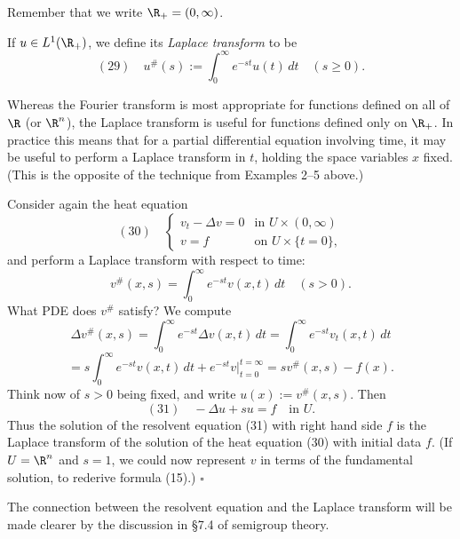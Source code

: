 Remember that we write $\R_+=(0,\infty)$.

\begin{definition}
\label{def:laplace-transform}
If $u\in L^1(\R_+)$, we define its \textit{Laplace transform} to be
$$(29) \quad u^{\#}(s) := \int_0^\infty e^{-st}u(t)\,dt \quad (s\ge 0).$$
\end{definition}

Whereas the Fourier transform is most appropriate for functions defined on all of $\R$ (or $\R^n$), the Laplace transform is useful for functions defined only on $\R_+$. In practice this means that for a partial differential equation involving time, it may be useful to perform a Laplace transform in $t$, holding the space variables $x$ fixed. (This is the opposite of the technique from Examples 2--5 above.)

\begin{example}
\label{ex:resolvent-laplace-transform}
Consider again the heat equation
$$(30) \quad \begin{cases} v_t-\Delta v=0 & \text{in } U\times(0,\infty) \\ v=f & \text{on } U\times\{t=0\}, \end{cases}$$
and perform a Laplace transform with respect to time:
$$v^{\#}(x,s) = \int_0^\infty e^{-st}v(x,t)\,dt \quad (s>0).$$
What PDE does $v^{\#}$ satisfy? We compute
$$\Delta v^{\#}(x,s) = \int_0^\infty e^{-st}\Delta v(x,t)\,dt = \int_0^\infty e^{-st}v_t(x,t)\,dt$$
$$= s\int_0^\infty e^{-st}v(x,t)\,dt + e^{-st}v\Big|_{t=0}^{t=\infty} = sv^{\#}(x,s) - f(x).$$
Think now of $s>0$ being fixed, and write $u(x):=v^{\#}(x,s)$. Then
$$(31) \quad -\Delta u+su=f \quad \text{in } U.$$
Thus the solution of the resolvent equation (31) with right hand side $f$ is the Laplace transform of the solution of the heat equation (30) with initial data $f$. (If $U=\R^n$ and $s=1$, we could now represent $v$ in terms of the fundamental solution, to rederive formula (15).) $\square$
\end{example}

The connection between the resolvent equation and the Laplace transform will be made clearer by the discussion in §7.4 of semigroup theory.

